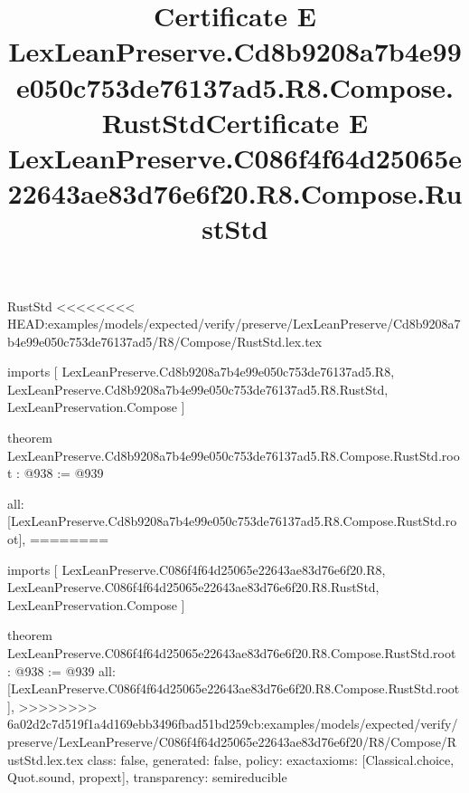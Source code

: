 \begin{lexlean}{RustStd}
<<<<<<<< HEAD:examples/models/expected/verify/preserve/LexLeanPreserve/Cd8b9208a7b4e99e050c753de76137ad5/R8/Compose/RustStd.lex.tex
\title{Certificate E LexLeanPreserve.Cd8b9208a7b4e99e050c753de76137ad5.R8.Compose.RustStd}
\begin{coremodule}
imports [
  LexLeanPreserve.Cd8b9208a7b4e99e050c753de76137ad5.R8,
  LexLeanPreserve.Cd8b9208a7b4e99e050c753de76137ad5.R8.RustStd,
  LexLeanPreservation.Compose
]

theorem LexLeanPreserve.Cd8b9208a7b4e99e050c753de76137ad5.R8.Compose.RustStd.root : @938 := @939 {
  all: [LexLeanPreserve.Cd8b9208a7b4e99e050c753de76137ad5.R8.Compose.RustStd.root],
========
\title{Certificate E LexLeanPreserve.C086f4f64d25065e22643ae83d76e6f20.R8.Compose.RustStd}
\begin{coremodule}
imports [
  LexLeanPreserve.C086f4f64d25065e22643ae83d76e6f20.R8,
  LexLeanPreserve.C086f4f64d25065e22643ae83d76e6f20.R8.RustStd,
  LexLeanPreservation.Compose
]

theorem LexLeanPreserve.C086f4f64d25065e22643ae83d76e6f20.R8.Compose.RustStd.root : @938 := @939 {
  all: [LexLeanPreserve.C086f4f64d25065e22643ae83d76e6f20.R8.Compose.RustStd.root],
>>>>>>>> 6a02d2c7d519f1a4d169ebb3496fbad51bd259cb:examples/models/expected/verify/preserve/LexLeanPreserve/C086f4f64d25065e22643ae83d76e6f20/R8/Compose/RustStd.lex.tex
  class: false,
  generated: false,
  policy: exact{axioms: [Classical.choice, Quot.sound, propext]},
  transparency: semireducible
}


\end{coremodule}}
\end{coremodule}
\end{lexlean}
